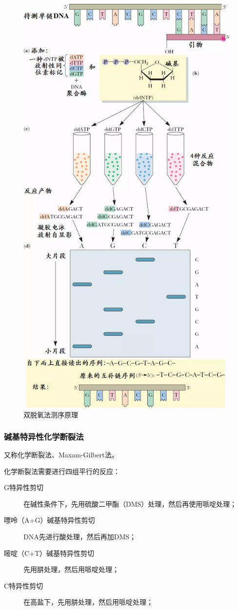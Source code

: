 \begin{figure}[p]
	\centering
	\includegraphics[width=0.7\linewidth]{Pics/Sanger法DNA测序}
	\caption{双脱氧法测序原理}
	\label{fig:sanger_dna}
\end{figure}

\subsubsection{碱基特异性化学断裂法}

又称化学断裂法、Maxam-Gilbert法。

化学断裂法需要进行四组平行的反应：

\begin{description}
	\item[G特异性剪切] 在碱性条件下，先用硫酸二甲酯（DMS）处理，然后再使用哌啶处理；
	\item[嘌呤（A+G）碱基特异性剪切] DNA先进行酸处理，然后再加DMS；
	\item[嘧啶（C+T）碱基特异性剪切] 先用肼处理，然后用哌啶处理；
	\item[C特异性剪切] 在高盐下，先用肼处理，然后用哌啶处理；
\end{description}

